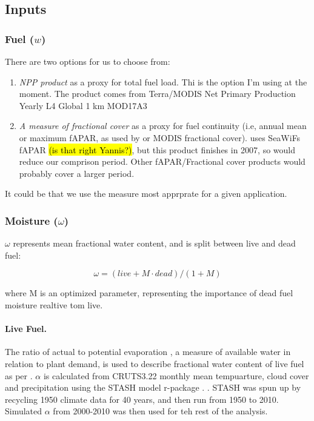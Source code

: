 \subsection{Inputs}
\begin{shaded}
\subsubsection{Fuel ($w$)}
There are two options for us to choose from:
\begin{enumerate}
    \item \textit{NPP product} as a proxy for total fuel load. Thi is the option I'm using at the moment. The product comes from Terra/MODIS Net Primary Production Yearly L4 Global 1 km MOD17A3 \citep{nasa2012terra}
    \item \textit{A measure of fractional cover} as a proxy for fuel continuity (i.e, annual mean or maximum fAPAR, as used by \citet{knorr2014impact,knorr2016climate} or MODIS fractional cover). \citet{bistinas2014causal} uses SeaWiFs fAPAR \hl{(is that right Yannis?)}, but this product finishes in 2007, so would reduce our comprison period. Other fAPAR/Fractional cover products would probably cover a larger period.
\end{enumerate}

It could be that we use the measure most apprprate for a given application.
\end{shaded}
\subsubsection{Moisture ($\omega$)}

$\omega$ represents mean fractional water content, and is split between live and dead fuel:

\begin{equation}
    \omega = (live + M \cdot dead) / (1 + M)
\end{equation}

where M is an optimized parameter, representing the importance of dead fuel moisture realtive tom live.

\paragraph{Live Fuel.}
The ratio of actual to potential evaporation \citep[$\alpha$][]{prentice1993simulation}, a measure of available water in relation to plant demand, is used to describe fractional water content of live fuel as per \citet{harrison2010fire, bistinas2014causal}.
$\alpha$ is calculated from CRUTS3.22 monthly mean tempuarture, cloud cover and precipitation using the STASH model \citep{sykes1996bioclimatic} r-package \citep{rstash}. . STASH was spun up by recycling 1950 climate data for 40 years, and then run from 1950 to 2010. Simulated $\alpha$ from 2000-2010 was then used for teh rest of the analysis.

